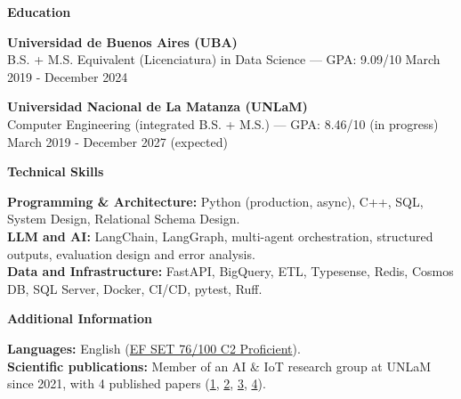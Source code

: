 \documentclass[10pt]{article}
\begin{document}
\vspace{-2pt}
\begin{center}
    \textbf{Education}
\end{center}
\vspace{-2pt}
\textbf{Universidad de Buenos Aires (UBA)}\\
B.S. + M.S. Equivalent (Licenciatura) in Data Science --- GPA: 9.09/10 \hfill March 2019 - December 2024

\vspace{2pt}
\textbf{Universidad Nacional de La Matanza (UNLaM)}\\
Computer Engineering (integrated B.S. + M.S.) --- GPA: 8.46/10 (in progress) \hfill March 2019 - December 2027 (expected)

\vspace{-2pt}
\begin{center}
    \textbf{Technical Skills}
\end{center}
\vspace{-2pt}
\textbf{Programming \& Architecture:} Python (production, async), C++, SQL, System Design, Relational Schema Design.\\
\textbf{LLM and AI:} LangChain, LangGraph, multi-agent orchestration, structured outputs, evaluation design and error analysis.\\
\textbf{Data and Infrastructure:} FastAPI, BigQuery, ETL, Typesense, Redis, Cosmos DB, SQL Server, Docker, CI/CD, pytest, Ruff.

\vspace{-2pt}
\begin{center}
    \textbf{Additional Information}
\end{center}
\vspace{-2pt}
\textbf{Languages:} English (\href{https://cert.efset.org/Pymcaz}{EF SET 76/100 C2 Proficient}).\\
\textbf{Scientific publications:} Member of an AI \& IoT research group at UNLaM since 2021, with 4 published papers (\href{https://github.com/LautaroLasorsa/CONAIISI-2023}{1}, \href{https://github.com/LautaroLasorsa/CONAIISI-2024}{2}, \href{https://github.com/carlucho1/CONAIISI-2024-2}{3}, \href{https://www.frcu.utn.edu.ar/images/CACIC/actas.pdf#page=169}{4}).
\end{document}
